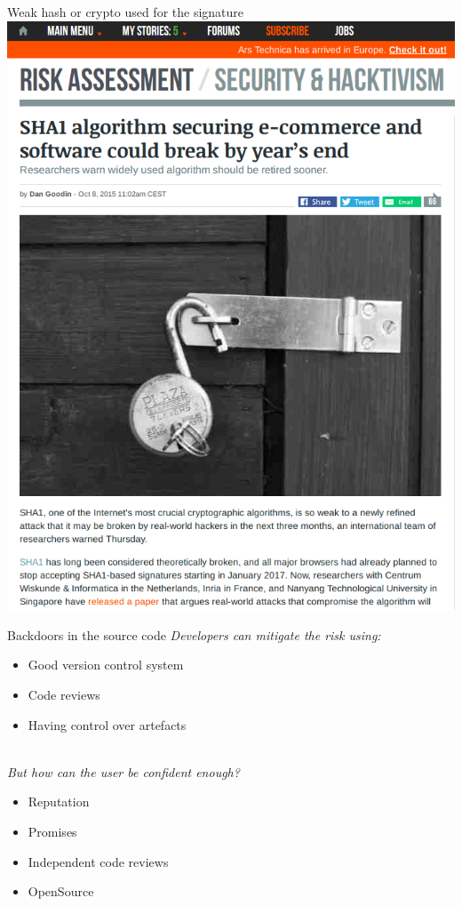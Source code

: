 \documentclass[11pt]{beamer}
\begin{document}
\begin{frame}{Weak hash or crypto used for the signature}
\includegraphics[scale=0.27]{sha1.png}
\end{frame}

\begin{frame}{Backdoors in the source code}
\emph{Developers can mitigate the risk using:}
\begin{itemize}
\item Good version control system
\item Code reviews
\item Having control over artefacts %
\end{itemize}
\\[0.2cm]
\pause
\emph{But how can the user be confident enough?}
\begin{itemize}
\item Reputation                    %
\item Promises                      %
\item Independent code reviews      %
\item OpenSource                    %
\end{itemize}
\end{frame}
\end{document}
